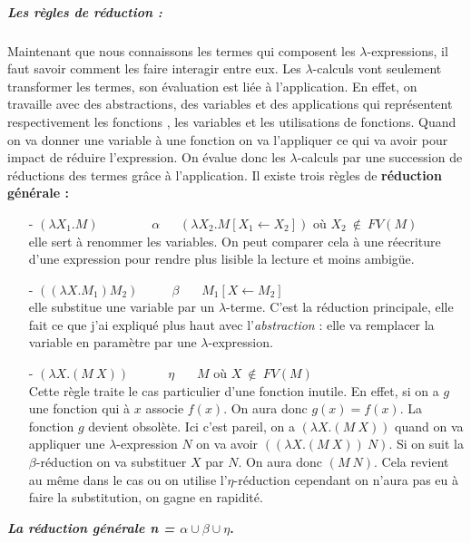 \documentclass[10pt,a4paper]{report}
\begin{document}
	\subparagraph{Les règles de réduction :}
	Maintenant que nous connaissons les termes qui composent les $\lambda$-expressions, il faut savoir
	comment les faire interagir entre eux. Les $\lambda$-calculs vont seulement transformer les termes, son évaluation est liée à l'application. En effet, on travaille avec des abstractions, des variables et des applications qui représentent respectivement les fonctions , les variables et les utilisations de fonctions. Quand on va donner une variable à une fonction on va l'appliquer ce qui va avoir pour impact de réduire l'expression. On évalue donc les $\lambda$-calculs par une succession de réductions des termes grâce à
	l'application. Il existe trois règles de \textbf{réduction générale :}
	\begin{itemize}
		\item[-] $(\lambda X_{1}.M)~~~~~~~~~~~~~~~~~~~\alpha~~~~~~~(\lambda X_{2}.M[X_{1} \leftarrow X_{2}])$
		où $X_{2}~\notin~FV(M)$ 
		\\
		elle sert à renommer les variables. On peut comparer cela à une réecriture d'une expression pour rendre plus lisible la lecture et moins ambigüe.
		\smallbreak
		\item[-] $((\lambda X.M_{1})M_{2})~~~~~~~~~~~~\beta~~~~~~~~M_{1}[X \leftarrow M_{2}]$ 
		\\
		elle substitue une variable par un $\lambda$-terme. C'est la réduction principale, elle fait ce que j'ai expliqué plus haut avec l'\textit{abstraction} : elle va remplacer la variable en paramètre par une $\lambda$-expression.
		\smallbreak
		\item[-] $(\lambda X.(M~X))~~~~~~~~~~~~~~\eta~~~~~~~~M$ 
		où $X~\notin~FV(M)$ 
		\\ Cette règle traite le cas particulier d'une fonction inutile. En effet, si on a $g$ une fonction qui à $x$ associe $f(x)$. On aura donc $g(x) = f(x)$. La fonction $g$ devient obsolète. Ici c'est pareil, on a $(\lambda X.(M~X))$ quand on va appliquer une $\lambda$-expression $N$ on va avoir $((\lambda X.(M~X))~N)$. Si on suit la $\beta$-réduction on va substituer $X$ par $N$. On aura donc $(M~N)$. Cela revient au même dans le cas ou on utilise l'$\eta$-réduction cependant on n'aura pas eu à faire la substitution, on gagne en rapidité. 
	\end{itemize}
	\medbreak
	
	\textbf{\textit{La réduction générale \textbf{n} = $\alpha \cup \beta \cup \eta$}.}
	\bigbreak
	
\end{document}
